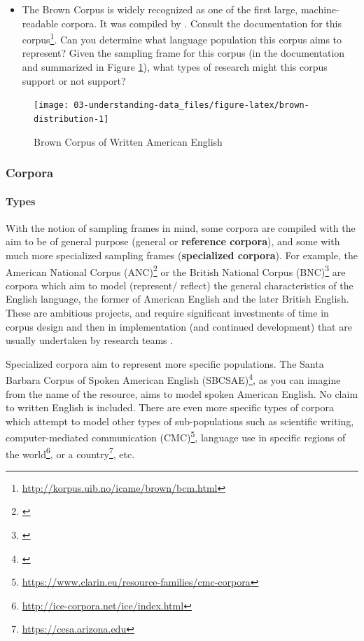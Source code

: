 \documentclass[
]{article}
\DeclareRobustCommand{\href}[2]{#2\footnote{\url{#1}}}
\newenvironment{rmdblock}[1]
  {\begin{shaded*}
  \begin{itemize}
  \renewcommand{\labelitemi}{
    \raisebox{-.5\height}[0pt][0pt]{
      {\setkeys{Gin}{width=2em,keepaspectratio}\texttt{[image: assets/images/\#1]}}
    }
  }
  \item
  }
  {
  \end{itemize}
  \end{shaded*}
  }
\newenvironment{rmdquestion}
  {\begin{rmdblock}{question}}
  {\end{rmdblock}}
\begin{document}
\begin{rmdquestion}
The Brown Corpus is widely recognized as one of the first large, machine-readable corpora. It was compiled by \citet{Kucera1967}. Consult the \href{http://korpus.uib.no/icame/brown/bcm.html}{documentation for this corpus}. Can you determine what language population this corpus aims to represent? Given the sampling frame for this corpus (in the documentation and summarized in Figure \ref{fig:brown-distribution}), what types of research might this corpus support or not support?
\end{rmdquestion}

\begin{figure}

{\centering \texttt{[image: 03-understanding-data\_files/figure-latex/brown-distribution-1]} 

}

\caption{Brown Corpus of Written American English}\label{fig:brown-distribution}
\end{figure}

\hypertarget{corpora}{%
\subsubsection{Corpora}\label{corpora}}

\hypertarget{types}{%
\paragraph{Types}\label{types}}

With the notion of sampling frames in mind, some corpora are compiled with the aim to be of general purpose (general or \textbf{reference corpora}), and some with much more specialized sampling frames (\textbf{specialized corpora}). For example, the \href{}{American National Corpus (ANC)} or the \href{}{British National Corpus (BNC)} are corpora which aim to model (represent/ reflect) the general characteristics of the English language, the former of American English and the later British English. These are ambitious projects, and require significant investments of time in corpus design and then in implementation (and continued development) that are usually undertaken by research teams \citep{Adel2020}.

Specialized corpora aim to represent more specific populations. The \href{}{Santa Barbara Corpus of Spoken American English (SBCSAE)}, as you can imagine from the name of the resource, aims to model spoken American English. No claim to written English is included. There are even more specific types of corpora which attempt to model other types of sub-populations such as scientific writing, \href{https://www.clarin.eu/resource-families/cmc-corpora}{computer-mediated communication (CMC)}, language use in specific \href{http://ice-corpora.net/ice/index.html}{regions of the world}, or \href{https://cesa.arizona.edu}{a country}, etc.
\end{document}

